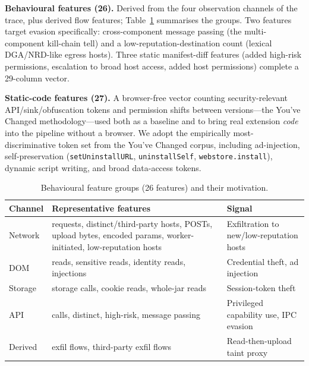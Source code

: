 \documentclass[conference]{IEEEtran}
\begin{document}
\noindent\textbf{Behavioural features (26).} Derived from the four observation channels of the
trace, plus derived flow features; Table~\ref{tab:features} summarises the groups. Two features
target evasion specifically: cross-component message passing (the multi-component kill-chain tell)
and a low-reputation-destination count (lexical DGA/NRD-like egress hosts). Three static
manifest-diff features (added high-risk permissions, escalation to broad host access, added host
permissions) complete a 29-column vector.

\noindent\textbf{Static-code features (27).} A browser-free vector counting security-relevant
API/sink/obfuscation tokens and permission shifts between versions---the You've Changed
methodology---used both as a baseline and to bring real extension \emph{code} into the pipeline
without a browser. We adopt the empirically most-discriminative token set from the You've Changed
corpus, including ad-injection, self-preservation (\texttt{setUninstallURL}, \texttt{uninstallSelf},
\texttt{webstore.install}), dynamic script writing, and broad data-access tokens.

\begin{table}[t]
\caption{Behavioural feature groups (26 features) and their motivation.}
\label{tab:features}
\centering
\footnotesize
\begin{tabular}{@{}p{13mm}p{36mm}p{22mm}@{}}
\toprule
\textbf{Channel} & \textbf{Representative features} & \textbf{Signal} \\
\midrule
Network & requests, distinct/third-party hosts, POSTs, upload bytes, encoded params,
worker-initiated, low-reputation hosts & Exfiltration to new/low-reputation hosts \\
DOM & reads, sensitive reads, identity reads, injections & Credential theft, ad injection \\
Storage & storage calls, cookie reads, whole-jar reads & Session-token theft \\
API & calls, distinct, high-risk, message passing & Privileged capability use, IPC evasion \\
Derived & exfil flows, third-party exfil flows & Read-then-upload taint proxy \\
\bottomrule
\end{tabular}
\end{table}

\end{document}
